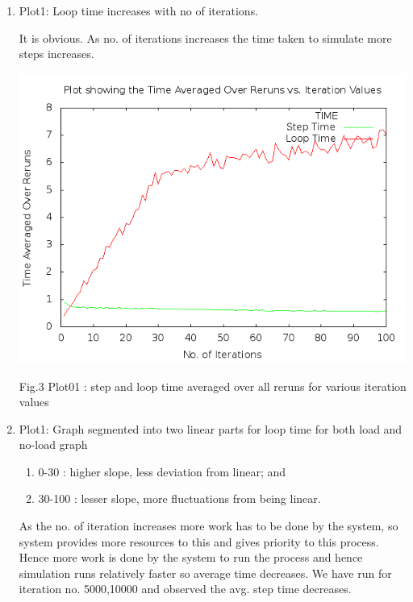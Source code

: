 \documentclass[a4paper,11pt]{article}
\begin{document}
\begin{enumerate}

\item{Plot1: Loop time increases with no of iterations.}
\begin{description}
It is obvious. As no. of iterations increases the time taken to simulate more steps increases.
\end{description}


\begin{center}
\includegraphics[scale=0.3]{./plots/g31_plot01.png}
\begin{center}
Fig.3 Plot01 : step and loop time averaged over all reruns for various iteration values
\end{center}
\end{center}

\item{Plot1: Graph segmented into two linear parts for loop time for both load and no-load graph
\begin{enumerate}
\item{0-30 :}
	higher slope, less deviation from linear; and
\item{30-100 :}
	lesser slope, more fluctuations from being linear.
\end{enumerate}}

\begin{description}
As the no. of iteration increases more work has to be done by the system, so system provides more resources to this and gives priority to this process. Hence more work is done by the system to run the process and hence simulation runs relatively faster so average time decreases.
We have run for iteration no. 5000,10000 and observed the avg. step time decreases.
\end{description}


\end{enumerate}
\end{document}
